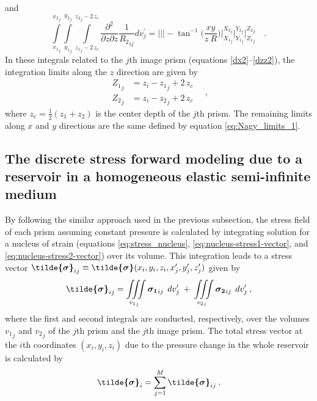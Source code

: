 \documentclass[journal abbreviation, manuscript]{copernicus}
\begin{document}
and
\begin{equation}
\int\limits_{{x_{1}}_{j}}^{{x_{2}}_{j}} \int\limits_{{y_{1}}_{j}}^{{y_{2}}_{j}} \int\limits_{{z_{1}}_{j} - 2 \, z_c}^{{z_{2}}_{j} - 2 \, z_c}
\frac{\partial^{2}  }{\partial z \partial z} {\frac{1}{{R_2}_{ij}}} dv_{j}^{\prime} =
\Bigg|\Bigg|\Bigg|
-   \tan^{-1} \Bigg( \frac{xy}{z \: R} \Bigg)
\Bigg|_{{X_1}_{j}}^{{X_2}_{j}} \Bigg|_{{Y_1}_{j}}^{{Y_2}_{j}} \Bigg|_{{Z_1}_{j}}^{{Z_2}_{j}} \quad .
\label{dzz2}
\end{equation}
In these integrals related to the $j$th image prism 
(equations \ref{dx2}--\ref{dzz2}), the integration limits along the $z$ direction
are given by
\begin{equation}
\begin{array}{ll}
{Z_1}_{j} &= z_i - {z_1}_{j} + 2 \, z_c \\
{Z_2}_{j} &= z_i - {z_2}_{j} + 2 \, z_c
\end{array} \quad ,
\label{eq:Nagy_limits_2}
\end{equation}
where $z_c = \frac{1}{2}(z_1 + z_2)$ is the center depth of the $j$th prism. 
The remaining limits along $x$ and $y$ directions are the same defined by equation 
\ref{eq:Nagy_limits_1}.


\subsection{The discrete stress forward modeling due to a reservoir in a homogeneous elastic semi-infinite medium}

By following the similar approach used in the previous subsection, the stress field of each prism assuming constant pressure is calculated by integrating solution for a 
nucleus of strain (equations \ref{eq:stress_nucleus}, \ref{eq:nucleus-stress1-vector},
and \ref{eq:nucleus-stress2-vector}) over its volume. 
This integration leads to a stress vector 
$\mbox{\boldmath$\tilde{\sigma}$}_{ij} \equiv \mbox{\boldmath$\tilde{\sigma}$}(x_{i}, y_{i}, z_{i}, x^{\prime}_{j}, y^{\prime}_{j}, z^{\prime}_{j})$ given by
\begin{equation}
\mbox{\boldmath$\tilde{\sigma}$}_{ij} = 
\iiint\limits_{{v_{1}}_{j}}
\mbox{\boldmath$\sigma_{1}$}_{ij} \: \:  dv_{j}^{\prime}
\: + \:
\iiint\limits_{{v_{2}}_{j}}
\mbox{\boldmath$\sigma_{2}$}_{ij} \:\:  dv_{j}^{\prime} \: ,
\label{eq:nucleus-stress_jth_prism}
\end{equation}
where the first and second integrals are conducted, respectively, over the volumes 
${v_{1}}_{j}$ and ${v_{2}}_{j}$ of the $j$th prism and the $j$th image prism.
The total stress vector at the $i$th coordinates  $(x_i, y_i, z_i)$ due to the 
pressure change in the whole reservoir is calculated by 
\begin{equation}
\mbox{\boldmath$\tilde{\sigma}$}_{i} = 
\sum_{j=1}^{M} \mbox{\boldmath$\tilde{\sigma}$}_{ij} \: .
\label{eq:nucleus-stress_M_prisms}
\end{equation}
\end{document}
